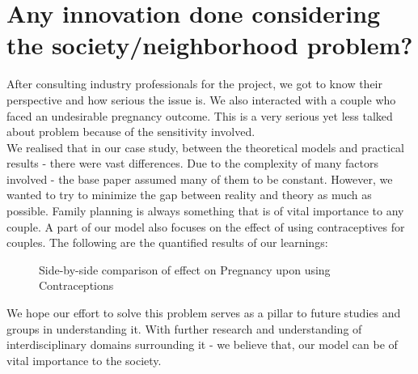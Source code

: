 \documentclass{article}
\begin{document}
\section{Any innovation done considering the society/neighborhood problem?}
After consulting industry professionals for the project, we got to know their perspective and how serious the issue is. We also interacted with a couple who faced an undesirable pregnancy outcome. This is a very serious yet less talked about problem because of the sensitivity involved. \\
We realised that in our case study, between the theoretical models and practical results - there were vast differences. Due to the complexity of many factors involved - the base paper assumed many of them to be constant. However, we wanted to try to minimize the gap between reality and theory as much as possible.\newline
Family planning is always something that is of vital importance to any couple. A part of our model also focuses on the effect of using contraceptives for couples. The following are the quantified results of our learnings: \\ 
\begin{figure}%
	\centering
	\qquad
	\caption{Side-by-side comparison of effect on Pregnancy upon using Contraceptions}%
	\label{fig:example}%
\end{figure}

We hope our effort to solve this problem serves as a pillar to future studies and groups in understanding it. With further research and understanding of interdisciplinary domains surrounding it - we believe that, our model can be of vital importance to the society.  
\end{document}
